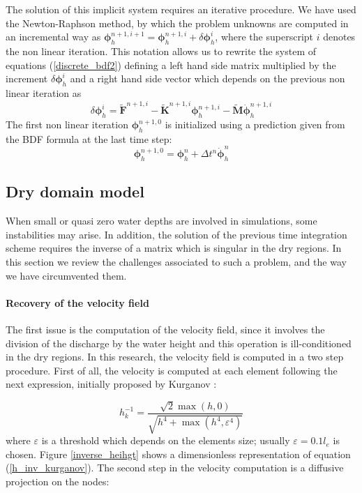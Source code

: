 \documentclass[a4paper,12pt]{article}
\begin{document}
The solution of this implicit system requires an iterative procedure. We have used the Newton-Raphson method, by which the problem unknowns are computed in an incremental way as
$\bm{\phi}_h^{n+1,i+1} = \bm{\phi}_h^{n+1,i} + \delta\bm{\phi}_h^i$,
where the superscript $i$ denotes the non linear iteration.
This notation allows us to rewrite the system of equations (\ref{discrete_bdf2}) defining a left hand side matrix multiplied by the increment $\delta\bm{\phi}_h^i$ and a right hand side vector which depends on the previous non linear iteration as
\begin{equation}
[\beta_0\tilde{\mathbf{M}} + \tilde{\mathbf{K}}^{n+1,i}] \delta\bm{\phi}_h^i
= \tilde{\mathbf{F}}^{n+1,i} - \tilde{\mathbf{K}}^{n+1,i}\bm{\phi}_h^{n+1,i} - \tilde{\mathbf{M}}\dot{\bm{\phi}}_h^{n+1,i}
\end{equation}
The first non linear iteration $\bm{\phi}_h^{n+1,0}$ is initialized using a prediction given from the BDF formula at the last time step:
\begin{equation}
\bm{\phi}_h^{n+1,0} = \bm{\phi}_h^n + \Delta t^n \dot{\bm{\phi}}_h^{n}
\end{equation}


\subsection{Dry domain model}

When small or quasi zero water depths are involved in simulations, some instabilities may arise. In addition, the solution of the previous time integration scheme requires the inverse of a matrix which is singular in the dry regions. In this section we review the challenges associated to such a problem, and the way we have circumvented them.

\paragraph{Recovery of the velocity field}
The first issue is the computation of the velocity field, since it involves the division of the discharge by the water height and this operation is ill-conditioned in the dry regions. In this research, the velocity field is computed in a two step procedure. First of all, the velocity is computed at each element following the next expression, initially proposed by Kurganov \cite{kurganov2007}:

\begin{equation} \label{h_inv_kurganov}
h^{-1}_k = \frac{\sqrt{2}\max(h,0)}{\sqrt{h^4 + \max(h^4, \varepsilon^4)}}
\end{equation}
where $\varepsilon$ is a threshold which depends on the elements size; usually $\varepsilon = 0.1 l_e$ is chosen. Figure \ref{inverse_heihgt} shows a dimensionless representation of equation (\ref{h_inv_kurganov}). The second step in the velocity computation is a diffusive projection on the nodes:
\end{document}
